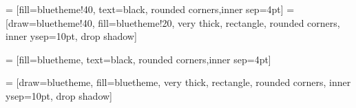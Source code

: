 
\newcommand{\processes}{\ensuremath{{\mathcal P}}}
\newcommand{\status}[2]{\ensuremath{S_{#1}^{#2}}}
\newcommand{\emitter}{\ensuremath{\texttt{emitter}}\xspace}
\newcommand{\observer}{\ensuremath{\texttt{observer}}\xspace}
\newcommand{\alive}{\ensuremath{\texttt{alive}}\xspace}
\newcommand{\dead}{\ensuremath{\texttt{dead}}}
\newcommand{\heartbeat}{\ensuremath{\textsc{heartbeat}}\xspace}
\newcommand{\timeoutping}{\ensuremath{\textsc{HB-Timeout}}\xspace}
\newcommand{\timeoutsuspect}{\ensuremath{\textsc{Susp-Timeout}}\xspace}
\newcommand{\timeout}[1]{\ensuremath{\textsc{Timeout}_{#1}}\xspace}
\newcommand{\newobserver}{\ensuremath{\textsc{NewObserver}}\xspace}
\newcommand{\findpred}{\ensuremath{\textit{FindEmitter}}\xspace}
\newcommand{\neighbors}{\ensuremath{\textit{Neighbors}}\xspace}
\newcommand{\broadcastmsg}{\ensuremath{\textsc{BcastMsg}}\xspace}
\newcommand{\pinginterval}{\ensuremath{\eta}\xspace}
\newcommand{\msgtime}{\ensuremath{\tau}\xspace}
\newcommand{\suspectinterval}{\ensuremath{\delta}\xspace}
\newcommand{\emittors}[1]{\ensuremath{M(#1)}}
\newcommand{\ringemittor}[1]{\ensuremath{M_R(#1)}}
\newcommand{\additionalemittors}[1]{\ensuremath{M_A(#1)}}
\newcommand{\receivers}[1]{\ensuremath{O(#1)}}
\newcommand{\ringreceiver}[1]{\ensuremath{O_R(#1)}}
\newcommand{\additionalreceivers}[1]{\ensuremath{O_A(#1)}}
\newcommand{\transfer}[2]{\ensuremath{T_{#1,#2}}}
\newcommand{\deadmsg}[1]{\ensuremath{\texttt{DeadMsg(\ensuremath{#1})}}}
\newcommand{\broadcastneighbors}[1]{\ensuremath{\mathcal B}_{#1}}
\newcommand{\deads}[1]{\ensuremath{{\mathcal D}_{#1}}}
\newcommand{\muind}{\ensuremath{\mu_{\text{ind}}}}
\newcommand{\ringalgorithm}{\textsc{RingAlgorithm}}

\newcommand{\probaSymbol}{\mathbb P}
\newcommand{\proba}[1]{\probaSymbol\left(#1\right)}


\usetikzlibrary{shadows,patterns,shapes}

 = [fill=bluetheme!40, text=black, rounded corners,inner sep=4pt] 
 = [draw=bluetheme!40, fill=bluetheme!20, very thick, rectangle, rounded corners, inner ysep=10pt, drop shadow]

 = [fill=bluetheme, text=black, rounded corners,inner sep=4pt] 

 = [draw=bluetheme, fill=bluetheme, very thick, rectangle, rounded corners, inner ysep=10pt, drop shadow]

